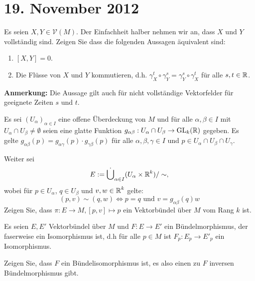 
\section{19. November 2012}
\setcounter{Aufg}{0} %
\setcounter{Loes}{0}

\begin{Aufg}
Es seien $X,Y \in \mathcal{V}(M)$. Der Einfachheit halber nehmen wir an, dass $X$ und $Y$ vollständig sind. Zeigen Sie dass die folgenden Aussagen äquivalent sind:
\begin{enumerate}[label=(\roman*),widest=ii]
\item
	$[X,Y]=0$.
\item
	Die Flüsse von $X$ und $Y$ kommutieren, d.h. $\gamma_X^t \circ \gamma_Y^s=\gamma_Y^s \circ \gamma_X^t$ für alle $s, t \in \operatorname{\mathbb{R}}$.
\end{enumerate}
{\footnotesize \textbf{Anmerkung:} Die Aussage gilt auch für nicht vollständige Vektorfelder für geeignete Zeiten $s$ und $t$.}
\end{Aufg}

\begin{Aufg}
Es sei $(U_\alpha)_{\alpha \in I}$ eine offene Überdeckung von $M$ und für alle $\alpha, \beta \in I$ mit $U_\alpha \cap U_\beta \neq \emptyset$ seien eine glatte Funktion $g_{\alpha \beta}:U_\alpha \cap U_\beta \to \mathrm{GL}_k(\operatorname{\mathbb{R}})$ gegeben. Es gelte $g_{\alpha \beta}(p)=g_{\alpha \gamma}(p) \cdot g_{\gamma \beta}(p)$ für alle $\alpha,\beta,\gamma \in I$ und $p \in U_\alpha \cap U_\beta \cap U_\gamma$. 

Weiter sei
	\[E:=\dot{\bigcup}_{\alpha \in I}(U_\alpha \times \operatorname{\mathbb{R}}^k)/ \sim, \]
wobei für $p \in U_\alpha$, $q \in U_\beta$ und $v,w \in \operatorname{\mathbb{R}}^k$ gelte:
	\[(p,v) \sim (q,w) \Leftrightarrow p=q \text{ und } v=g_{\alpha \beta}(q) w\]
Zeigen Sie, dass $\pi: E \to M, [p,v]\mapsto p$ ein Vektorbündel über $M$ vom Rang $k$ ist.
\end{Aufg}

\begin{Aufg}
Es seien $E, E'$ Vektorbündel über $M$ und $F:E \to E'$ ein Bündelmorphismus, der faserweise ein Isomorphismus ist, d.h für alle $p \in M$ ist $F_p:E_p \to E'_p$ ein Isomorphismus.

Zeigen Sie, dass $F$ ein Bündelisomorphismus ist, es also einen zu $F$ inversen Bündelmorphismus gibt.
\end{Aufg}

